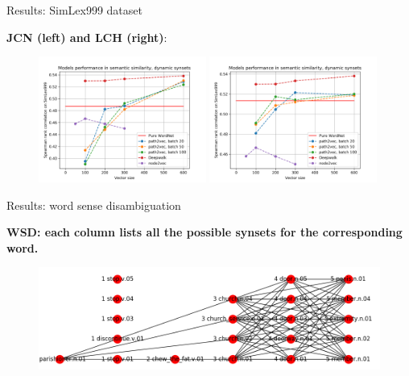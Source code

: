 \begin{frame}{Results: SimLex999 dataset}

\textbf{JCN (left) and LCH (right)}:

\begin{figure}
    \centering
    \includegraphics[width=0.49\textwidth]{figures/jcn-semcor-thresh01-near50_dynamic_synsets.png}
     \includegraphics[width=0.49\textwidth]{figures/lch-thresh15-near50_dynamic_synsets.png}
       
\end{figure}
	
\end{frame}


\begin{frame}{Results: word sense disambiguation}

\textbf{WSD: each column lists all the possible synsets for the corresponding word.}


\begin{figure}
       \centering
       \includegraphics[width=\textwidth]{figures/graph_wsd_example}
\end{figure}
	
\end{frame}



